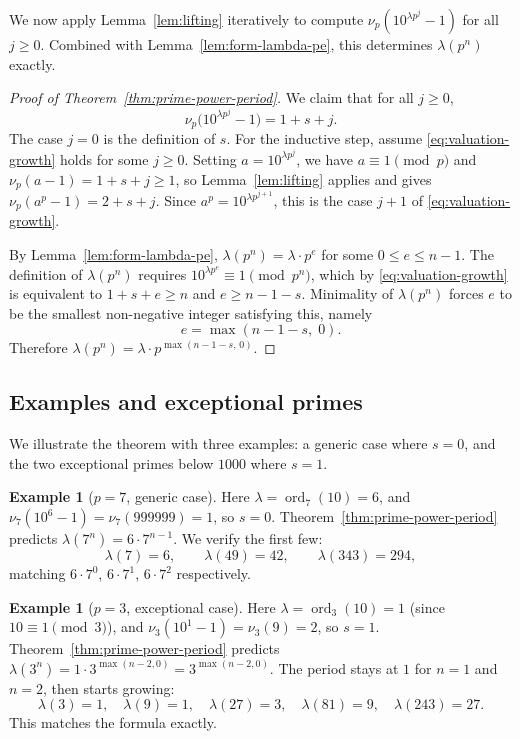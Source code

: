 \documentclass[12pt]{amsart}
\theoremstyle{definition}
\newtheorem{example}[theorem]{Example}
\theoremstyle{remark}
\newcommand{\ord}{\operatorname{ord}}
\begin{document}
We now apply Lemma~\ref{lem:lifting} iteratively to compute 
$\nu_p(10^{\lambda p^j} - 1)$ for all $j \ge 0$. Combined with 
Lemma~\ref{lem:form-lambda-pe}, this determines $\lambda(p^n)$ exactly.

\begin{proof}[Proof of Theorem~\ref{thm:prime-power-period}]
We claim that for all $j \ge 0$,
\begin{equation}\label{eq:valuation-growth}
  \nu_p\bigl(10^{\lambda p^j} - 1\bigr) = 1 + s + j.
\end{equation}
The case $j = 0$ is the definition of $s$. For the inductive step, 
assume \eqref{eq:valuation-growth} holds for some $j \ge 0$. Setting 
$a = 10^{\lambda p^j}$, we have $a \equiv 1 \pmod{p}$ and 
$\nu_p(a - 1) = 1 + s + j \ge 1$, so Lemma~\ref{lem:lifting} applies 
and gives $\nu_p(a^p - 1) = 2 + s + j$. Since 
$a^p = 10^{\lambda p^{j+1}}$, this is the case $j+1$ of 
\eqref{eq:valuation-growth}.

By Lemma~\ref{lem:form-lambda-pe}, $\lambda(p^n) = \lambda \cdot p^e$ 
for some $0 \le e \le n - 1$. The definition of $\lambda(p^n)$ 
requires $10^{\lambda p^e} \equiv 1 \pmod{p^n}$, which by 
\eqref{eq:valuation-growth} is equivalent to $1 + s + e \ge n$ and
$e \ge n - 1 - s$. Minimality of $\lambda(p^n)$ forces $e$ to be the 
smallest non-negative integer satisfying this, namely
\[
  e = \max(n - 1 - s,\; 0).
\]
Therefore $\lambda(p^n) = \lambda \cdot p^{\max(n-1-s,\, 0)}$.
\end{proof}


\subsection{Examples and exceptional primes}\label{subsec:examples}

We illustrate the theorem with three examples: a generic case where 
$s = 0$, and the two exceptional primes below $1000$ where $s = 1$.

\begin{example}[$p = 7$, generic case]\label{ex:p-7}
Here $\lambda = \ord_7(10) = 6$, and $\nu_7(10^6 - 1) = \nu_7(999999) 
= 1$, so $s = 0$. Theorem~\ref{thm:prime-power-period} predicts 
$\lambda(7^n) = 6 \cdot 7^{n-1}$. We verify the first few:
\[
  \lambda(7) = 6, \qquad \lambda(49) = 42, \qquad \lambda(343) = 294,
\]
matching $6 \cdot 7^0$, $6 \cdot 7^1$, $6 \cdot 7^2$ respectively.
\end{example}

\begin{example}[$p = 3$, exceptional case]\label{ex:p-3}
Here $\lambda = \ord_3(10) = 1$ (since $10 \equiv 1 \pmod{3}$), and 
$\nu_3(10^1 - 1) = \nu_3(9) = 2$, so $s = 1$. 
Theorem~\ref{thm:prime-power-period} predicts $\lambda(3^n) = 
1 \cdot 3^{\max(n - 2, 0)} = 3^{\max(n-2, 0)}$. The period stays at 
$1$ for $n = 1$ and $n = 2$, then starts growing:
\[
  \lambda(3) = 1, \quad \lambda(9) = 1, \quad \lambda(27) = 3, \quad 
  \lambda(81) = 9, \quad \lambda(243) = 27.
\]
This matches the formula exactly.
\end{example}
\end{document}
